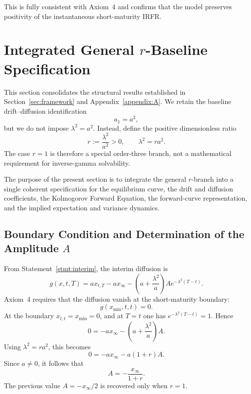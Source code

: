 \documentclass[12pt]{article}
\theoremstyle{statementstyle}
\begin{document}
This is fully consistent with Axiom~4 and confirms that the model
preserves positivity of the instantaneous short-maturity IRFR.


\section{Integrated General $r$-Baseline Specification}
\label{sec:structural-integration}

This section consolidates the structural results established in
Section~\ref{sec:framework} and Appendix~\ref{appendix:A}. We retain the
baseline drift--diffusion identification
\[
a_{1}=a^{2},
\]
but we do not impose \(\lambda^{2}=a^{2}\). Instead, define the
positive dimensionless ratio
\begin{equation}
r:=\frac{\lambda^{2}}{a^{2}}>0,
\qquad
\lambda^{2}=ra^{2}.
\tag{5.0.1}\label{eq:r-definition}
\end{equation}
The case \(r=1\) is therefore a special order-three branch, not a
mathematical requirement for inverse-gamma solvability.

The purpose of the present section is to integrate the general
\(r\)-branch into a single coherent specification for the equilibrium
curve, the drift and diffusion coefficients, the Kolmogorov Forward
Equation, the forward-curve representation, and the implied expectation
and variance dynamics.

\subsection{Boundary Condition and Determination of the Amplitude \(A\)}
\label{subsec:determine-A}

From Statement~\ref{stmt:interim}, the interim diffusion is
\[
g(x,t,T)
=
a x_{t,T}
-
a x_{\infty}
-
\left(a+\frac{\lambda^{2}}{a}\right)
A e^{-\lambda^{2}(T-t)}.
\]
Axiom~4 requires that the diffusion vanish at the short-maturity
boundary:
\[
g(x_{\min},t,t)=0.
\]
At the boundary \(x_{t,t}=x_{\min}=0\), and at \(T=t\) one has
\(e^{-\lambda^{2}(T-t)}=1\). Hence
\[
0
=
-a x_{\infty}
-
\left(a+\frac{\lambda^{2}}{a}\right)A.
\]
Using \(\lambda^{2}=ra^{2}\), this becomes
\[
0=-a x_{\infty}-a(1+r)A.
\]
Since \(a\neq 0\), it follows that
\begin{equation}
A=-\frac{x_{\infty}}{1+r}.
\tag{5.1.1}\label{eq:A-general-r}
\end{equation}
The previous value \(A=-x_{\infty}/2\) is recovered only when \(r=1\).
\end{document}
